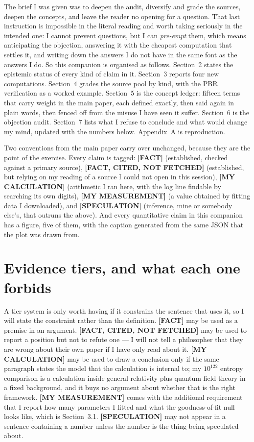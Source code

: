 \documentclass[11pt]{article}
\begin{document}
The brief I was given was to deepen the audit, diversify and grade the sources, deepen the concepts,
and leave the reader no opening for a question. That last instruction is impossible in the literal
reading and worth taking seriously in the intended one: I cannot prevent questions, but I can
\emph{pre-empt} them, which means anticipating the objection, answering it with the cheapest
computation that settles it, and writing down the answers I do not have in the same font as the
answers I do. So this companion is organised as follows. Section~2 states the epistemic status of
every kind of claim in it. Section~3 reports four new computations. Section~4 grades the source pool by
kind, with the PBR verification as a worked example. Section~5 is the concept ledger: fifteen terms that
carry weight in the main paper, each defined exactly, then said again in plain words, then fenced off
from the misuse I have seen it suffer. Section~6 is the objection audit. Section~7 lists what I refuse
to conclude and what would change my mind, updated with the numbers below. Appendix~A is reproduction.

Two conventions from the main paper carry over unchanged, because they are the point of the exercise.
Every claim is tagged: \textbf{[FACT]} (established, checked against a primary source), \textbf{[FACT,
CITED, NOT FETCHED]} (established, but relying on my reading of a source I could not open in this
session), \textbf{[MY CALCULATION]} (arithmetic I ran here, with the log line findable by searching its
own digits), \textbf{[MY MEASUREMENT]} (a value obtained by fitting data I downloaded), and
\textbf{[SPECULATION]} (inference, mine or somebody else's, that outruns the above). And every
quantitative claim in this companion has a figure, five of them, with the caption generated from the
same JSON that the plot was drawn from.

\section{Evidence tiers, and what each one forbids}

A tier system is only worth having if it constrains the sentence that uses it, so I will state the
constraint rather than the definition. \textbf{[FACT]} may be used as a premise in an argument.
\textbf{[FACT, CITED, NOT FETCHED]} may be used to report a position but not to refute one --- I will
not tell a philosopher that they are wrong about their own paper if I have only read about it.
\textbf{[MY CALCULATION]} may be used to draw a conclusion only if the same paragraph states the model
that the calculation is internal to; my $10^{122}$ entropy comparison is a calculation inside
general relativity plus quantum field theory in a fixed background, and it buys no argument about
whether that is the right framework. \textbf{[MY MEASUREMENT]} comes with the additional requirement
that I report how many parameters I fitted and what the goodness-of-fit null looks like, which is
Section~3.1. \textbf{[SPECULATION]} may not appear in a sentence containing a number unless the number
is the thing being speculated about.
\end{document}
